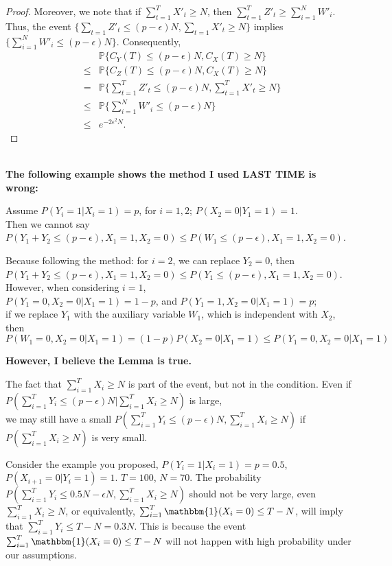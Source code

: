 \begin{proof}
Moreover, we note that if $\sum_{t = 1}^T X'_{t} \geq N$, then $\sum_{t=1}^T Z'_t \geq \sum_{i=1}^N W'_i$.
Thus, the event $\{\sum_{t=1}Z'_t \leq (p-\epsilon)N, \sum_{t=1}X'_t \geq N\}$ implies $\{\sum_{i=1}^N W'_i \leq (p-\epsilon) N\}$. 
Consequently, 
\begin{eqnarray}
&&\mathbb{P}\{C_Y(T) \leq (p-\epsilon) N, C_X(T) \geq N \} \nonumber \\
&\leq & \mathbb{P}\{C_Z(T) \leq (p-\epsilon) N, C_X(T) \geq N \} \nonumber \\
 &=& \mathbb{P}\{\sum_{t=1}^TZ'_t \leq (p-\epsilon)N, \sum_{t=1}^TX'_t \geq N\}\nonumber\\
&\leq & \mathbb{P}\{\sum_{i=1}^N W'_i \leq (p-\epsilon) N\} \nonumber \\
&\leq& e^{-2\epsilon^2N}.
\end{eqnarray}
\end{proof}

\\

\textbf{The following example shows the method I used LAST TIME is wrong:}

Assume $P(Y_i = 1 | X_i = 1) = p$, for $i = 1,2$; $P(X_2 = 0 | Y_1 = 1) = 1$.\\

Then we cannot say $P(Y_1 + Y_2 \leq (p-\epsilon), X_1 = 1, X_2 = 0) \leq P(W_1 \leq (p-\epsilon), X_1 = 1, X_2 = 0)$.

Because following the method: for $i = 2$, we can replace $Y_2 = 0$, then\\
         $P(Y_1 + Y_2 \leq (p-\epsilon), X_1 = 1, X_2 = 0) \leq P(Y_1 \leq (p-\epsilon), X_1 = 1, X_2 = 0)$.\\
However, when considering $i = 1$,\\
         $P(Y_1 = 0, X_2 = 0|X_1 = 1) = 1-p$, and $P(Y_1 = 1, X_2 = 0|X_1 = 1) = p$;\\
         if we replace $Y_1$ with the auxiliary variable $W_1$, which is independent with $X_2$, then\\
         $P(W_1 = 0, X_2 = 0|X_1 = 1) = (1-p) P(X_2 = 0 |X_1 = 1) \leq P(Y_1 = 0, X_2 = 0|X_1 = 1)$

\textbf{However, I believe the Lemma is true.}

The fact that $\sum_{i = 1}^T X_i \geq N$ is part of the event, but not in the condition.
Even if $P(\sum_{i = 1}^T Y_i \leq (p-\epsilon)N | \sum_{i = 1}^T X_i \geq N)$ is large,\\
we may still have a small $P(\sum_{i = 1}^T Y_i \leq (p-\epsilon)N ,  \sum_{i = 1}^T X_i \geq N)$ if  $P(\sum_{i = 1}^T X_i \geq N)$ is very small.

Consider the example you proposed, $P(Y_i = 1 | X_i = 1) = p = 0.5$, $P(X_{i+1} = 0|Y_i = 1) = 1$. $T = 100$, $N = 70$.
The probability $P(\sum_{i=1}^T Y_i \leq 0.5N - \epsilon N, \sum_{i=1}^T X_{i} \geq N)$ should not be very large, even $\sum_{i=1}^T X_{i} \geq N$, or equivalently, $\sum_{i=1}^T \mathbbm{1}(X_{i} = 0) \leq T - N$, will imply that $\sum_{i=1}^T Y_i \leq T-N = 0.3N$. This is because the event $\sum_{i=1}^T \mathbbm{1}(X_{i} = 0) \leq T - N$ will not happen with high probability under our assumptions. 